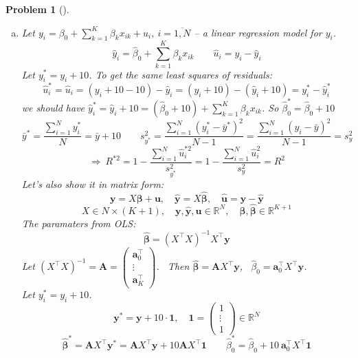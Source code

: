 \documentclass[12pt,a4]{article}
\newtheorem{problem}{Problem}
\newcommand{\bR}{{\mathbb R}}
\newcommand{\ba}{{\mathbf a}}
\newcommand{\bu}{{\mathbf u}}
\newcommand{\bx}{{\mathbf x}}
\newcommand{\by}{{\mathbf y}}
\newcommand{\bA}{{\mathbf A}}
\newcommand{\bbeta}{{\pmb \beta}}
\newcommand{\one}{{\mathbf 1}}
\begin{document}
\begin{problem}[]\rm \begin{enumerate}[(a)] .
	\item Let $y_i = \beta_0 + \sum_{k=1}^K \beta_k x_{ik} + u_i,~ i=\overline{1,N}$ -- a linear regression model for $y_i$. 
\[
\hat y_i = \hat \beta_0 + \sum_{k=1}^K \beta_k x_{ik}
\qquad
\hat u_i = y_i - \hat y_i
\]
Let $y_i^* = y_i + 10$. To get the same least squares of residuals:
\[
\hat u^*_i = \hat u_i = (y_i + 10 - 10) - \hat y_i= (y_i + 10) - (\hat y_i + 10) = y^*_i - \hat y^*_i
\]
we should have $\hat y^*_i = \hat y_i + 10 = (\hat \beta_0+10) + \sum_{k=1}^K \beta_k x_{ik}$. So $\hat \beta^*_0 = \hat \beta_0+10$
\[
\bar y^* = \frac{\sum_{i=1}^Ny_i^*}{N} = \bar y + 10
\qquad
s^2_{y^*} = \frac{\sum_{i=1}^N(y_i^*-\bar y^*)^2}{N-1} = \frac{\sum_{i=1}^N(y_i-\bar y)^2}{N-1} = s^2_y
\]
\[
\Rightarrow ~
R^{*2} =
1 - \frac{\sum_{i=1}^N\hat u^{*2}_i}{s^2_{y^*}} = 
1 - \frac{\sum_{i=1}^N\hat u^{2}_i}{s^2_y} = R^2
\]
Let's also show it in matrix form:
\[
\by = X\bbeta + \bu, \quad \hat \by = X\hat\bbeta, \quad \hat \bu = \by - \hat \by
\]
\[
X \in N\times (K+1), \quad \by,\hat\by, \bu \in \bR^N, \quad \bbeta, \hat \bbeta \in \bR^{K+1}
\]
The paramaters from OLS:
\[
\hat \bbeta = (X^\top X)^{-1}X^\top \by
\]
Let $(X^\top X)^{-1} = \bA = \begin{pmatrix} \ba_0^\top \\ \vdots \\ \ba_K^\top\end{pmatrix}$.
~Then $\hat \bbeta = \bA X^\top \by$, ~$\hat \beta_0 = \ba_0^\top X^\top \by$.\\[5pt]
Let $y_i^* = y_i + 10$.
\[
\by^* = \by + 10 \cdot \one,
\quad
\one = \begin{pmatrix}1 \\ \vdots \\ 1\end{pmatrix}\in\bR^N
\]
\[
\hat \bbeta^* = \bA X^\top \by^* =
\bA X^\top \by + 10 \bA X^\top \one
\qquad
\hat \beta^*_0 =
\hat \beta_0 + 10~\ba_0^\top X^\top \one
\]
\end{enumerate}
\end{problem}
\end{document}
